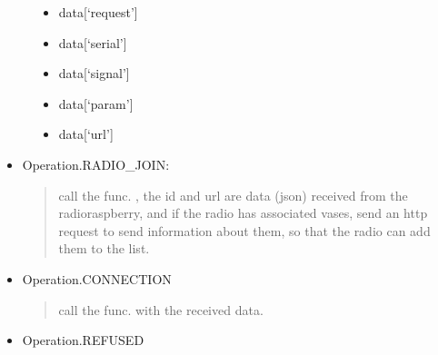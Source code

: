 \documentclass[letterpaper,10pt,english]{sphinxmanual}
\begin{document}
\begin{fulllineitems}
\label{\detokenize{index:controller.request.request}}
\begin{description}
\item[{}] \leavevmode\begin{itemize}
\item {} 
data{[}‘request’{]}

\item {} 
data{[}‘serial’{]}

\end{itemize}

\item[{}] \leavevmode\begin{itemize}
\item {} 
data{[}‘signal’{]}

\item {} 
data{[}‘param’{]}

\item {} 
data{[}‘url’{]}

\end{itemize}

\end{description}

\begin{itemize}
\item {} 
Operation.RADIO\_JOIN:
\begin{quote}

call the func. , the id and url are data (json) received from the
radio\sphinxhyphen{}raspberry, and if the radio has associated vases, send an http request to send
information about them, so that the radio can add them to the list.
\end{quote}

\item {} 
Operation.CONNECTION
\begin{quote}

call the func.  with the received data.
\end{quote}

\item {} 
Operation.REFUSED
\begin{quote}


\end{quote}
\end{itemize}
\end{fulllineitems}
\end{document}
